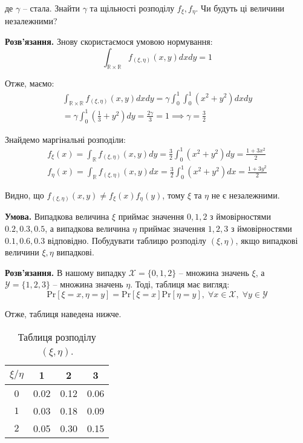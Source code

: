 \documentclass[oneside,solution]{karazin-prob-theory-assign}
\begin{document}
де $\gamma$ -- стала. Знайти $\gamma$ та щільності розподілу $f_{\xi},f_{\eta}$. Чи будуть ці величини незалежними? 

\textbf{Розв'язання.} Знову скористаємося умовою нормування:
\begin{equation}
    \int_{\mathbb{R} \times \mathbb{R}}f_{(\xi,\eta)}(x,y)dxdy = 1
\end{equation}

Отже, маємо:
\begin{gather}
    \int_{\mathbb{R} \times \mathbb{R}}f_{(\xi,\eta)}(x,y)dxdy = \gamma \int_0^1 \int_0^1 (x^2+y^2)dxdy \nonumber \\
    = \gamma \int_0^1 \left(\frac{1}{3} + y^2\right)dy = \frac{2\gamma}{3} = 1 \implies \boxed{\gamma = \frac{3}{2}}
\end{gather}

Знайдемо маргінальні розподіли:
\begin{gather}
    f_{\xi}(x) = \int_{\mathbb{R}} f_{(\xi,\eta)}(x,y)dy = \frac{3}{2}\int_0^1 (x^2+y^2)dy = \frac{1+3x^2}{2} \\
    f_{\eta}(x) = \int_{\mathbb{R}} f_{(\xi,\eta)}(x,y)dx = \frac{3}{2}\int_0^1 (x^2+y^2)dx = \frac{1+3y^2}{2}
\end{gather}

Видно, що $f_{(\xi,\eta)}(x,y) \neq f_{\xi}(x)f_{\eta}(y)$, тому $\xi$ та $\eta$ не є незалежними.


\hspace{20px}\textbf{Умова.} Випадкова величина $\xi$ приймає значення $0,1,2$ з ймовірностями $0.2,0.3,0.5$, а випадкова величина $\eta$ приймає значення $1,2,3$ з ймовірностями $0.1,0.6,0.3$ відповідно. Побудувати таблицю розподілу $(\xi,\eta)$, якщо випадкові величини $\xi,\eta$ випадкові.

\textbf{Розв'язання.} В нашому випадку $\mathcal{X} = \{0,1,2\}$ -- множина значень $\xi$, а $\mathcal{Y} = \{1,2,3\}$ -- множина значень $\eta$. Тоді, таблиця має вигляд:
\begin{equation}
    \text{Pr}[\xi=x,\eta=y] = \text{Pr}[\xi=x]\text{Pr}[\eta=y], \; \forall x \in \mathcal{X}, \; \forall y \in \mathcal{Y}
\end{equation}

Отже, таблиця наведена нижче.

\begin{table}[H]
    \centering
    \begin{tabular}{c|c|c|c}
         $\xi/\eta$ & 1 & 2 & 3  \\ \hline 
         0 & 0.02 & 0.12 & 0.06 \\ \hline
         $1$ & 0.03 & 0.18 & 0.09 \\ \hline
         $2$ & 0.05 & 0.30 & 0.15
    \end{tabular}
    \caption{Таблиця розподілу $(\xi,\eta)$.}
    \label{tab:table_1}
\end{table}
\end{document}

